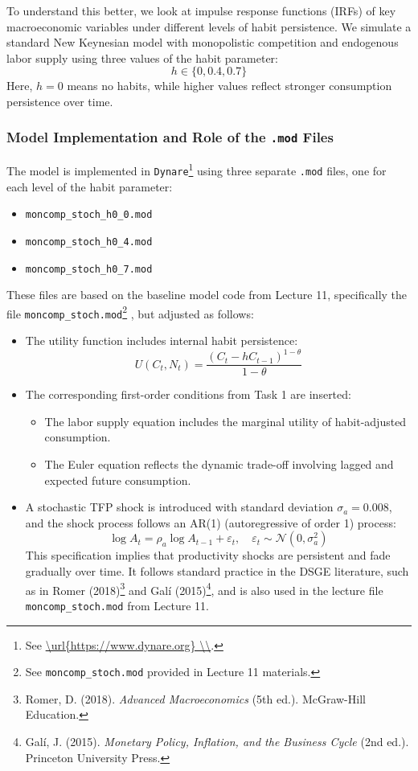 \documentclass[12pt,a4paper,notitlepage]{article}
\numberwithin{equation}{section}
\begin{document}
\begin{itemize}
\begin{itemize}
\vspace{1em}

To understand this better, we look at impulse response functions (IRFs) of key macroeconomic variables under different levels of habit persistence. We simulate a standard New Keynesian model with monopolistic competition and endogenous labor supply using three values of the habit parameter:
\[
h \in \{0, 0.4, 0.7\}
\]
Here, \( h = 0 \) means no habits, while higher values reflect stronger consumption persistence over time.


\subsubsection{   Model Implementation and Role of the \texttt{.mod} Files}


The model is implemented in \texttt{Dynare}\footnote{See \url {\url{https://www.dynare.org} \\}.} using three separate \texttt{.mod} files, one for each level of the habit parameter:
\begin{itemize}
    \item \texttt{moncomp\_stoch\_h0\_0.mod}
    \item \texttt{moncomp\_stoch\_h0\_4.mod}
    \item \texttt{moncomp\_stoch\_h0\_7.mod}
\end{itemize}

These files are based on the baseline model code from Lecture 11, specifically the file \texttt{moncomp\_stoch.mod}\footnote{See \texttt{moncomp\_stoch.mod} provided in Lecture 11 materials.}
, but adjusted as follows:
\begin{itemize}
    \item The utility function includes internal habit persistence:
    \[
    U(C_t, N_t) = \frac{(C_t - h C_{t-1})^{1 - \theta}}{1 - \theta}
    \]
    \item The corresponding first-order conditions from Task 1 are inserted:
    \begin{itemize}
        \item The labor supply equation includes the marginal utility of habit-adjusted consumption.
        \item The Euler equation reflects the dynamic trade-off involving lagged and expected future consumption.
    \end{itemize}
    \item A stochastic TFP shock is introduced with standard deviation \( \sigma_a = 0.008 \), and the shock process follows an AR(1) (autoregressive of order 1) process:
\[
\log A_t = \rho_a \log A_{t-1} + \varepsilon_t, \quad \varepsilon_t \sim \mathcal{N}(0, \sigma_a^2)
\]
This specification implies that productivity shocks are persistent and fade gradually over time. It follows standard practice in the DSGE literature, such as in Romer (2018)\footnote{Romer, D. (2018). \textit{Advanced Macroeconomics} (5th ed.). McGraw-Hill Education.} and Galí (2015)\footnote{Galí, J. (2015). \textit{Monetary Policy, Inflation, and the Business Cycle} (2nd ed.). Princeton University Press.}, and is also used in the lecture file \texttt{moncomp\_stoch.mod} from Lecture 11.


\end{itemize}
\end{itemize}
\end{itemize}
\end{document}
